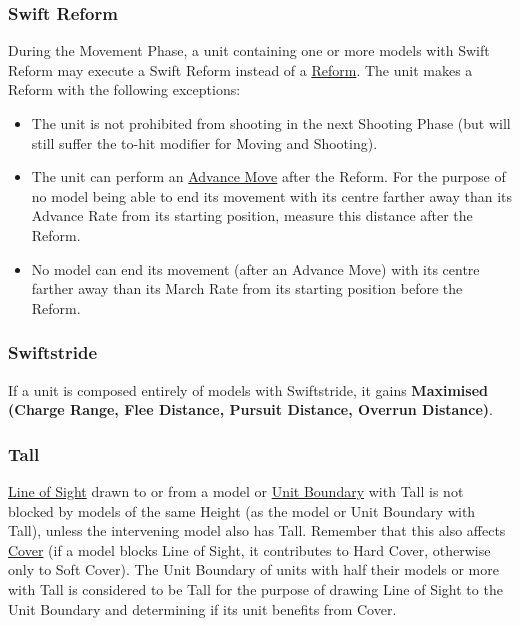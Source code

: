 \subsubsection{Swift Reform}
\label{swift_reform}

During the Movement Phase, a unit containing one or more models with Swift Reform may execute a Swift Reform instead of a \hyperref[reform]{Reform}. The unit makes a Reform with the following exceptions:
\begin{itemize}
	\item The unit is not prohibited from shooting in the next Shooting Phase (but will still suffer the to-hit modifier for Moving and Shooting).
	\item The unit can perform an \hyperref[advance_move]{Advance Move} after the Reform. For the purpose of no model being able to end its movement with its centre farther away than its Advance Rate from its starting position, measure this distance after the Reform.
	\item No model can end its movement (after an Advance Move) with its centre farther away than its March Rate from its starting position before the Reform.
\end{itemize}

\subsubsection{Swiftstride}
\idx[main=y]{\swiftstride}\label{swiftstride}

If a unit is composed entirely of models with Swiftstride, it gains \textbf{Maximised (Charge Range, Flee Distance, Pursuit Distance, Overrun Distance)}.

\subsubsection{Tall}
\idx[main=y]{\tall}\label{tall}

\hyperref[line_of_sight]{Line of Sight} drawn to or from a model or \hyperref[boundary_rectangle]{Unit Boundary} with Tall is not blocked by models of the same Height (as the model or Unit Boundary with Tall), unless the intervening model also has Tall. Remember that this also affects \hyperref[cover]{Cover} (if a model blocks Line of Sight, it contributes to Hard Cover, otherwise only to Soft Cover). The Unit Boundary of units with half their models or more with Tall is considered to be Tall for the purpose of drawing Line of Sight to the Unit Boundary and determining if its unit benefits from Cover.

